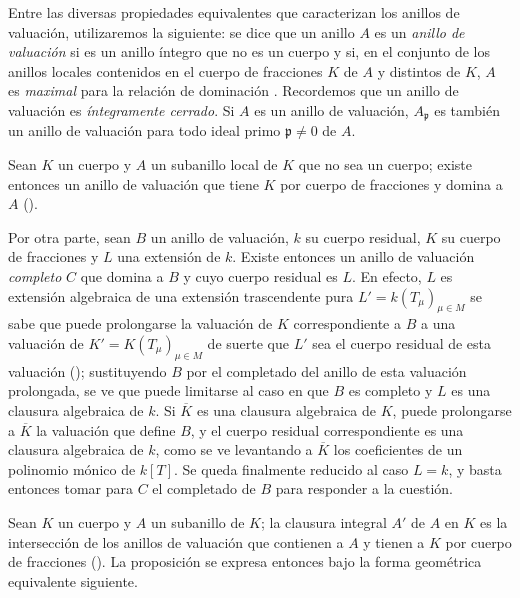 \documentclass[oneside,10pt]{amsart}
\newcommand{\oldpage}[2][]{\marginnote{\normalfont\footnotesize\textbf{#1}~|~#2}\ignorespaces}
\let\EGAOriginalLabel\label
\renewcommand{\label}[1]{\phantomsection\EGAOriginalLabel{#1}}
\begin{document}
\begin{env}[7.1.1]
\label{II.7.1.1-fr}
Entre las diversas propiedades equivalentes que caracterizan los anillos de valuación, utilizaremos la siguiente:
se dice que un anillo $A$ es un \emph{anillo de valuación} si es un anillo íntegro que no es un cuerpo y si, en el conjunto de los anillos locales contenidos en el cuerpo de fracciones $K$ de $A$ y distintos de $K$, $A$ es \emph{maximal} para la relación de dominación .
Recordemos que un anillo de valuación es \emph{íntegramente cerrado}.
Si $A$ es un anillo de valuación, $A_{\mathfrak{p}}$ es también un anillo de valuación para todo ideal primo $\mathfrak{p}\neq0$ de $A$.
\end{env}

\begin{env}[7.1.2]
\label{II.7.1.2-fr}
Sean $K$ un cuerpo y $A$ un subanillo local de $K$ que no sea un cuerpo;
\oldpage[II]{139}
existe entonces un anillo de valuación que tiene $K$ por cuerpo de fracciones y domina a $A$ (\cite[p.~1-07, lema~2]{I-1}).

Por otra parte, sean $B$ un anillo de valuación, $k$ su cuerpo residual, $K$ su cuerpo de fracciones y $L$ una extensión de $k$.
Existe entonces un anillo de valuación \emph{completo} $C$ que domina a $B$ y cuyo cuerpo residual es $L$.
En efecto, $L$ es extensión algebraica de una extensión trascendente pura
$L'=k(T_\mu)_{\mu\in M}$
se sabe que puede prolongarse la valuación de $K$ correspondiente a $B$ a una valuación de
$K'=K(T_\mu)_{\mu\in M}$
de suerte que $L'$ sea el cuerpo residual de esta valuación (\cite[p.~98]{II-24});
sustituyendo $B$ por el completado del anillo de esta valuación prolongada, se ve que puede limitarse al caso en que $B$ es completo y $L$ es una clausura algebraica de $k$.
Si $\overline{K}$ es una clausura algebraica de $K$, puede prolongarse a $\overline{K}$ la valuación que define $B$, y el cuerpo residual correspondiente es una clausura algebraica de $k$, como se ve levantando a $\overline{K}$ los coeficientes de un polinomio mónico de $k[T]$.
Se queda finalmente reducido al caso $L=k$, y basta entonces tomar para $C$ el completado de $B$ para responder a la cuestión.
\end{env}

\begin{env}[7.1.3]
\label{II.7.1.3-fr}
Sean $K$ un cuerpo y $A$ un subanillo de $K$;
la clausura integral $A'$ de $A$ en $K$ es la intersección de los anillos de valuación que contienen a $A$ y tienen a $K$ por cuerpo de fracciones (\cite[p.~51, th.~2]{I-11}).
La proposición  se expresa entonces bajo la forma geométrica equivalente siguiente.
\end{env}
\end{document}
